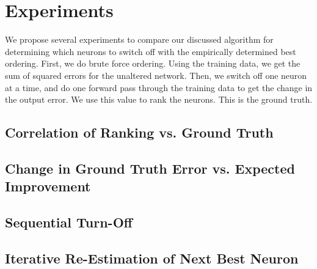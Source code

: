 \section{Experiments}
We propose several experiments to compare our discussed algorithm for determining which neurons to switch off with the empirically determined best ordering. First, we do brute force ordering. Using the training data, we get the sum of squared errors for the unaltered network. Then, we switch off one neuron at a time, and do one forward pass through the training data to get the change in the output error. We use this value to rank the neurons. This is the ground truth. 
\subsection{Correlation of Ranking vs. Ground Truth}
\subsection{Change in Ground Truth Error vs. Expected Improvement}
\subsection{Sequential Turn-Off}
\subsection{Iterative Re-Estimation of Next Best Neuron}